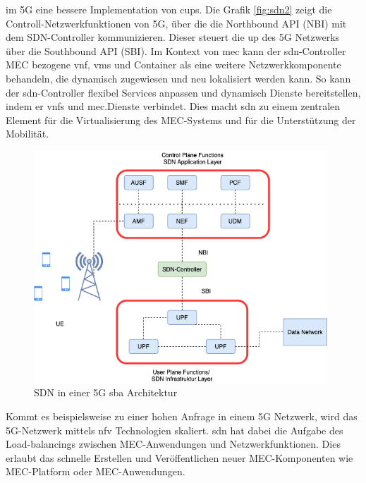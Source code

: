 \documentclass[runningheads]{llncs}
\numberwithin{figure}{section}
\begin{document}
im 5G eine bessere Implementation von \acrfull{cups}. Die Grafik \ref{fig:sdn2} zeigt die Controll-Netzwerkfunktionen von 5G,
über die die Northbound API (NBI) mit dem SDN-Controller kommunizieren. Dieser steuert die \acrshort{up} des 5G Netzwerks über
die Southbound API (SBI).
Im Kontext von \acrshort{mec} kann der \acrshort{sdn}-Controller MEC bezogene \acrshort{vnf}, 
\acrshort{vm}s und Container als eine weitere Netzwerkkomponente behandeln, die dynamisch zugewiesen und neu lokalisiert werden kann.
So kann der \acrshort{sdn}-Controller flexibel Services anpassen und dynamisch Dienste bereitstellen, 
indem er \acrshort{vnf}s und \acrshort{mec}.Dienste verbindet. Dies macht \acrshort{sdn} zu einem zentralen Element für die Virtualisierung
des MEC-Systems und für die Unterstützung der Mobilität.
\begin{figure}
  \centering
  \includegraphics[width=11cm]{images/sdn2.png}
  \caption{SDN in einer 5G \acrshort{sba} Architektur}
  \label{fig:sn2}
\end{figure}
Kommt es beispielsweise zu einer hohen Anfrage in einem 5G Netzwerk, wird das 5G-Netzwerk mittels \acrshort{nfv} Technologien skaliert.
\acrshort{sdn} hat dabei die Aufgabe des Load-balancings zwischen MEC-Anwendungen und Netzwerkfunktionen. Dies erlaubt das 
schnelle Erstellen und Veröffentlichen neuer MEC-Komponenten wie MEC-Platform oder MEC-Anwendungen.
\end{document}
